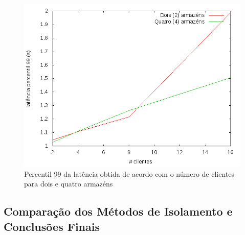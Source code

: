 \begin{figure}[!h]
\centering
\includegraphics[scale=.5]{img/questao-1/read-com-lat-pct99}
\caption{Percentil 99 da latência obtida de acordo com o número de clientes para dois e quatro armazéns}
\end{figure}

\subsection{Comparação dos Métodos de Isolamento e  Conclusões Finais}
